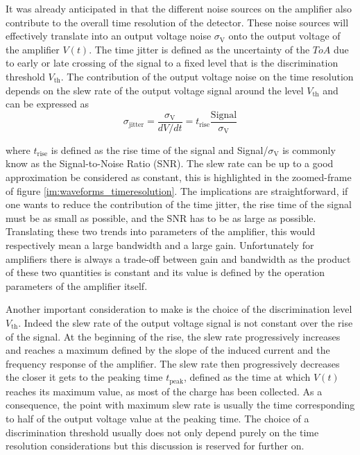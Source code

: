 		It was already anticipated in  that the different noise sources on the amplifier also contribute to the overall time resolution of the detector. These noise sources will effectively translate into an output voltage noise $\sigma_\text{V}$ onto the output voltage of the amplifier $V(t)$. The time jitter is defined as the uncertainty of the $ToA$ due to early or late crossing of the signal to a fixed level that is the discrimination threshold $V_{\text{th}}$. The contribution of the output voltage noise on the time resolution depends on the slew rate of the output voltage signal around the level $V_{\text{th}}$ and can be expressed as
		\begin{equation}
			\sigma_{\text{jitter}} = \frac{\sigma_{\text{V}}}{dV/dt} = t_{\text{rise}} \frac{\text{Signal}}{\sigma_{\text{V}}}
		\end{equation}  
		
		where $t_{\text{rise}}$ is defined as the rise time of the signal and Signal/$\sigma_{\text{V}}$ is commonly know as the Signal-to-Noise Ratio (SNR). The slew rate can be up to a good approximation be considered as constant, this is highlighted in the zoomed-frame of figure \ref{im:waveforms_timeresolution}. The implications are straightforward, if one wants to reduce the contribution of the time jitter, the rise time of the signal must be as small as possible, and the SNR has to be as large as possible. Translating these two trends into parameters of the amplifier, this would respectively mean a large bandwidth and a large gain. Unfortunately for amplifiers there is always a trade-off between gain and bandwidth as the product of these two quantities is constant and its value is defined by the operation parameters of the amplifier itself. 
	
		Another important consideration to make is the choice of the discrimination level $V_{\text{th}}$. Indeed the slew rate of the output voltage signal is not constant over the rise of the signal. At the beginning of the rise, the slew rate progressively increases and reaches a maximum defined by the slope of the induced current and the frequency response of the amplifier. The slew rate then progressively decreases the closer it gets to the peaking time $t_{\text{peak}}$, defined as the time at which $V(t)$ reaches its maximum value, as most of the charge has been collected. As a consequence, the point with maximum slew rate is usually the time corresponding to half of the output voltage value at the peaking time. The choice of a discrimination threshold usually does not only depend purely on the time resolution considerations but this discussion is reserved for further on. 
		
